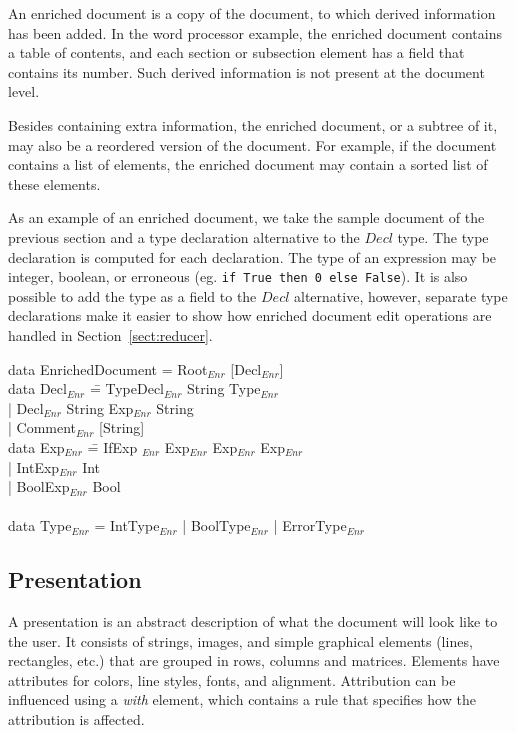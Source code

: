 An enriched document is a copy of the document, to which derived information has been added. In the word processor example, the enriched document contains a table of contents, and each section or subsection element has a field that contains its number. Such derived information is not present at the document level.

Besides containing extra information, the enriched document, or a subtree of it, may also be a reordered version of the document. For example, if the document contains a list of elements, the enriched document may contain a sorted list of these elements.

As an example of an enriched document, we take the sample document of the previous section and a type declaration alternative to the $Decl$ type. The type declaration is computed for each declaration. The type of an expression may be integer, boolean, or erroneous (eg. {\tt if True then 0 else False}). It is also possible to add the type as a field to the $Decl$ alternative, however, separate type declarations make it easier to show how enriched document edit operations are handled in Section~\ref{sect:reducer}.

\noindent
\ttfamily
\begin{tabbing}
data EnrichedDocument = Root$_{Enr}$ [Decl$_{Enr}$]\\
data Decl$_{Enr}$ \= = TypeDecl$_{Enr}$ String Type$_{Enr}$\\
                           \> | Decl$_{Enr}$ String Exp$_{Enr}$ String\\
                           \> | Comment$_{Enr}$ [String]\\
data Exp$_{Enr}$ \= =  IfExp $_{Enr}$ Exp$_{Enr}$ Exp$_{Enr}$ Exp$_{Enr}$\\
                 \> | IntExp$_{Enr}$ Int\\
                 \> | BoolExp$_{Enr}$ Bool\\
\\
data Type$_{Enr}$ = IntType$_{Enr}$ | BoolType$_{Enr}$ | ErrorType$_{Enr}$
\end{tabbing}
\rmfamily


%																
\subsection{Presentation} \label{sect:presLevel}

A presentation is an abstract description of what the document will look like to the user. It consists of strings, images, and simple graphical elements (lines, rectangles, etc.) that are grouped in rows, columns and matrices. Elements have attributes for colors, line styles, fonts, and alignment. Attribution can be influenced using a {\em with} element, which contains a rule that specifies how the attribution is affected.

